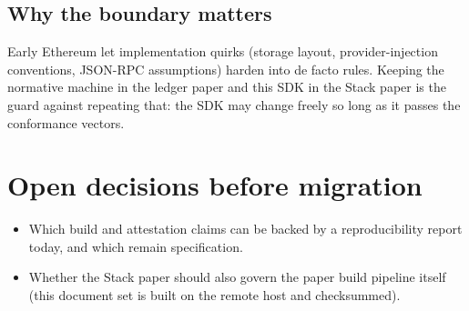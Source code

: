 \documentclass[a4paper,11pt,twoside,parskip=half-,headings=small]{scrartcl}
\begin{document}
\subsection{Why the boundary matters}
Early Ethereum let implementation quirks (storage layout, provider-injection conventions, JSON-RPC assumptions) harden into de facto rules. Keeping the normative machine in the ledger paper and this SDK in the Stack paper is the guard against repeating that: the SDK may change freely so long as it passes the conformance vectors.

\section{Open decisions before migration}
\begin{itemize}
  \item Which build and attestation claims can be backed by a reproducibility report today, and which remain specification.
  \item Whether the Stack paper should also govern the paper build pipeline itself (this document set is built on the remote host and checksummed).
\end{itemize}
\end{document}
